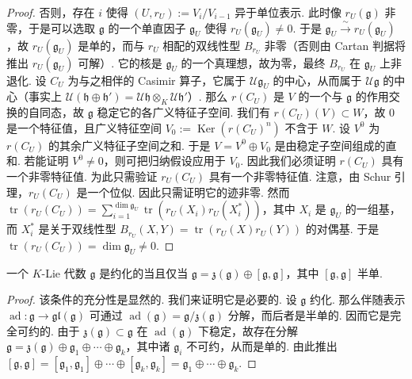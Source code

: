 \begin{numpara}[用表示刻画]
\begin{proof}
否则，存在 $i$ 使得 $(U,r_{U}):=V_{i}/V_{i-1}$ 异于单位表示. 此时像 $r_{U}(\mathfrak g)$ 非零，于是可以选取 $\mathfrak g$ 的一个单直因子 $\mathfrak g_{U}$ 使得 $r_{U}(\mathfrak g_{U})\neq 0$. 于是 $\mathfrak g_{U}\xrightarrow{\ \sim\ }r_{U}(\mathfrak g_{U})$，故 $r_{U}(\mathfrak g_{U})$ 是单的，而与 $r_{U}$ 相配的双线性型 $B_{r_{U}}$ 非零（否则由 Cartan 判据将推出 $r_{U}(\mathfrak g_{U})$ 可解）. 它的核是 $\mathfrak g_{U}$ 的一个真理想，故为零，最终 $B_{r_{U}}$ 在 $\mathfrak g_{U}$ 上非退化. 设 $C_{U}$ 为与之相伴的 Casimir 算子，它属于 $\mathcal U\mathfrak g_{U}$ 的中心，从而属于 $\mathcal U\mathfrak g$ 的中心（事实上 $\mathcal U(\mathfrak h\oplus\mathfrak h')=\mathcal U\mathfrak h\otimes_{K}\mathcal U\mathfrak h'$）. 那么 $r(C_{U})$ 是 $V$ 的一个与 $\mathfrak g$ 的作用交换的自同态，故 $\mathfrak g$ 稳定它的各广义特征子空间. 我们有 $r(C_{U})(V)\subset W$，故 $0$ 是一个特征值，且广义特征空间 $V_{0}:=\operatorname{Ker}(r(C_{U})^{n})$ 不含于 $W$. 设 $V^{0}$ 为 $r(C_{U})$ 的其余广义特征子空间之和. 于是 $V=V^{0}\oplus V_{0}$ 是由稳定子空间组成的直和. 若能证明 $V^{0}\neq 0$，则可把归纳假设应用于 $V_{0}$. 因此我们必须证明 $r(C_{U})$ 具有一个非零特征值. 为此只需验证 $r_{U}(C_{U})$ 具有一个非零特征值. 注意，由 Schur 引理，$r_{U}(C_{U})$ 是一个位似. 因此只需证明它的迹非零. 然而 $\operatorname{tr}(r_{U}(C_{U}))=\sum_{i=1}^{\dim\mathfrak g_{U}}\operatorname{tr}(r_{U}(X_{i})r_{U}(X_{i}^{*}))$，其中 $X_{i}$ 是 $\mathfrak g_{U}$ 的一组基，而 $X_{i}^{*}$ 是关于双线性型 $B_{r_{U}}(X,Y)=\operatorname{tr}(r_{U}(X)r_{U}(Y))$ 的对偶基. 于是 $\operatorname{tr}(r_{U}(C_{U}))=\dim\mathfrak g_{U}\neq 0$.
\end{proof}
\begin{corollary*}
一个 $K$-Lie 代数 $\mathfrak g$ 是约化的当且仅当 $\mathfrak g=\mathfrak z(\mathfrak g)\oplus[\mathfrak g,\mathfrak g]$，其中 $[\mathfrak g,\mathfrak g]$ 半单.
\end{corollary*}
\begin{proof}
该条件的充分性是显然的. 我们来证明它是必要的. 设 $\mathfrak g$ 约化. 那么伴随表示 $\operatorname{ad}:\mathfrak g\longrightarrow\mathfrak{gl}(\mathfrak g)$ 可通过 $\operatorname{ad}(\mathfrak g)=\mathfrak g/\mathfrak z(\mathfrak g)$ 分解，而后者是半单的. 因而它是完全可约的. 由于 $\mathfrak z(\mathfrak g)\subset\mathfrak g$ 在 $\operatorname{ad}(\mathfrak g)$ 下稳定，故存在分解 $\mathfrak g=\mathfrak z(\mathfrak g)\oplus\mathfrak g_{1}\oplus\cdots\oplus\mathfrak g_{k}$，其中诸 $\mathfrak g_{i}$ 不可约，从而是单的. 由此推出 $[\mathfrak g,\mathfrak g]=[\mathfrak g_{1},\mathfrak g_{1}]\oplus\cdots\oplus[\mathfrak g_{k},\mathfrak g_{k}]=\mathfrak g_{1}\oplus\cdots\oplus\mathfrak g_{k}$.
\end{proof}
\end{numpara}
